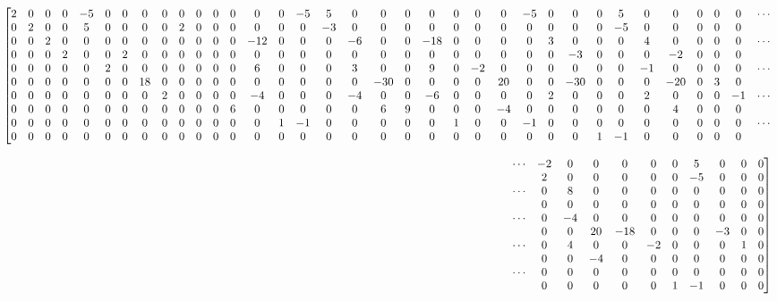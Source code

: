 \documentclass[10pt,oneside,reqno]{amsart}
\begin{document}
\begin{landscape}
	\[ \setcounter{MaxMatrixCols}{44}
	\left[\begin{matrix}
		2 & 0 & 0 & 0 & -5 & 0 & 0 & 0 & 0 & 0 & 0 & 0 & 0 & 0 & 0 & -5 & 5 & 0 & 0 & 0 & 0 & 0 & 0 & 0 & -5 & 0 & 0 & 0 & 5 & 0 & 0 & 0 & 0 & 0 & \cdots \\
		0 & 2 & 0 & 0 & 5 & 0 & 0 & 0 & 0 & 2 & 0 & 0 & 0 & 0 & 0 & 0 & -3 & 0 & 0 & 0 & 0 & 0 & 0 & 0 & 0 & 0 & 0 & 0 & -5 & 0 & 0 & 0 & 0 & 0 \\
		0 & 0 & 2 & 0 & 0 & 0 & 0 & 0 & 0 & 0 & 0 & 0 & 0 & -12 & 0 & 0 & 0 & -6 & 0 & 0 & -18 & 0 & 0 & 0 & 0 & 3 & 0 & 0 & 0 & 4 & 0 & 0 & 0 & 0 & \cdots \\
		0 & 0 & 0 & 2 & 0 & 0 & 2 & 0 & 0 & 0 & 0 & 0 & 0 & 0 & 0 & 0 & 0 & 0 & 0 & 0 & 0 & 0 & 0 & 0 & 0 & 0 & -3 & 0 & 0 & 0 & -2 & 0 & 0 & 0 \\
		0 & 0 & 0 & 0 & 0 & 2 & 0 & 0 & 0 & 0 & 0 & 0 & 0 & 6 & 0 & 0 & 0 & 3 & 0 & 0 & 9 & 0 & -2 & 0 & 0 & 0 & 0 & 0 & 0 & -1 & 0 & 0 & 0 & 0 & \cdots \\
		0 & 0 & 0 & 0 & 0 & 0 & 0 & 18 & 0 & 0 & 0 & 0 & 0 & 0 & 0 & 0 & 0 & 0 & -30 & 0 & 0 & 0 & 0 & 20 & 0 & 0 & -30 & 0 & 0 & 0 & -20 & 0 & 3 & 0 \\
		0 & 0 & 0 & 0 & 0 & 0 & 0 & 0 & 2 & 0 & 0 & 0 & 0 & -4 & 0 & 0 & 0 & -4 & 0 & 0 & -6 & 0 & 0 & 0 & 0 & 2 & 0 & 0 & 0 & 2 & 0 & 0 & 0 & -1 & \cdots \\
		0 & 0 & 0 & 0 & 0 & 0 & 0 & 0 & 0 & 0 & 0 & 0 & 6 & 0 & 0 & 0 & 0 & 0 & 6 & 9 & 0 & 0 & 0 & -4 & 0 & 0 & 0 & 0 & 0 & 0 & 4 & 0 & 0 & 0 \\
		0 & 0 & 0 & 0 & 0 & 0 & 0 & 0 & 0 & 0 & 0 & 0 & 0 & 0 & 1 & -1 & 0 & 0 & 0 & 0 & 0 & 1 & 0 & 0 & -1 & 0 & 0 & 0 & 0 & 0 & 0 & 0 & 0 & 0 & \cdots \\
		0 & 0 & 0 & 0 & 0 & 0 & 0 & 0 & 0 & 0 & 0 & 0 & 0 & 0 & 0 & 0 & 0 & 0 & 0 & 0 & 0 & 0 & 0 &	0 & 0 & 0 & 0 & 1 & -1 & 0 & 0 & 0 & 0 & 0
	\end{matrix}\right. \]

	\vspace{4mm}

	\[\hspace{157mm}\left.\begin{matrix}
		\cdots & -2 & 0 & 0 & 0 & 0 & 0 & 5 & 0 & 0 & 0 \\
		& 2 & 0 & 0 & 0 & 0 & 0 & -5 & 0 & 0 & 0 \\
		\cdots & 0 & 8 & 0 & 0 & 0 & 0 & 0 & 0 & 0 & 0 \\
		& 0 & 0 & 0 & 0 & 0 & 0 & 0 & 0 & 0 & 0 \\
		\cdots & 0 & -4 & 0 & 0 & 0 & 0 & 0 & 0 & 0 & 0 \\
		& 0 & 0 & 20 & -18 & 0 & 0 & 0 & -3 & 0 & 0 \\
		\cdots & 0 & 4 & 0 & 0 & -2 & 0 & 0 & 0 & 1 & 0 \\
		& 0 & 0 & -4 & 0 & 0 & 0 & 0 & 0 & 0 & 0 \\
		\cdots & 0 & 0 & 0 & 0 & 0 & 0 & 0 & 0 & 0 & 0 \\
		& 0 & 0 & 0 & 0 & 0 & 1 & -1 & 0 & 0 & 0		
	\end{matrix}\right] \]
\end{landscape}
\end{document}
